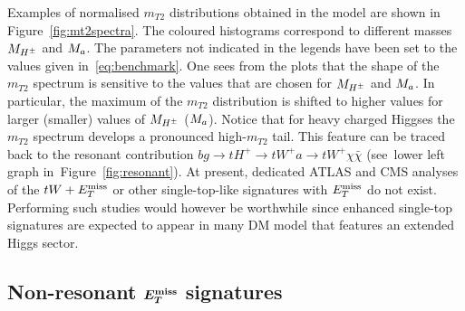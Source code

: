 Examples of normalised $m_{T2}$ distributions obtained in the \hdma model are shown in Figure~\ref{fig:mt2spectra}. The coloured histograms correspond to different masses $M_{H^{\pm}}$ and $M_{a}$. The parameters not indicated in the legends have been set to the values given in~\eqref{eq:benchmark}. One sees from the plots that the shape of the $m_{T2}$ spectrum is sensitive to the values that are chosen for $M_{H^{\pm}}$ and $M_{a}$. In particular, the maximum of the $m_{T2}$ distribution is shifted to higher values for larger (smaller) values of $M_{H^{\pm}}$ ($M_{a}$). Notice that for heavy charged Higgses the $m_{T2}$ spectrum develops a pronounced high-$m_{T2}$ tail.  This feature can be traced back to the resonant contribution $b g \to t H^+  \to  t W^+ a  \to t W^+ \chi \bar \chi$ (see~lower left graph in~Figure~\ref{fig:resonant}). At present, dedicated ATLAS and CMS analyses of the $tW + E_T^\mathrm{miss}$  or other single-top-like signatures with $E_T^\mathrm{miss}$ do not exist. Performing such studies would however be worthwhile since enhanced single-top signatures are expected to appear in many DM model that features an extended Higgs sector. 

\subsection[Non-resonant $E_T^{\rm miss}$ signatures]{Non-resonant $\mbox{\boldmath$E_T^{\rm miss}$\unboldmath}$ signatures}
\label{sec:nonresonant}


